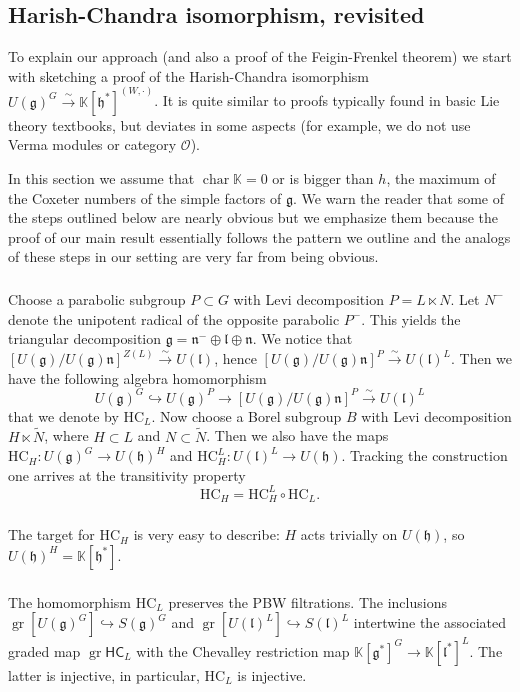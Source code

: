 \documentclass{amsart}
\theoremstyle{definition}
\newcommand{\fl}{\mathfrak{l}}
\newcommand{\sss}{\subsubsection{}}
\newcommand{\g}{\mathfrak{g}}
\newcommand{\gr}{\operatorname{gr}}
\newcommand{\h}{\mathfrak{h}}
\newcommand{\HC}{\mathrm{HC}} %
\newcommand{\lf}{\mathfrak{l}}
\newcommand{\bK}{\mathbb{K}}
\renewcommand{\bK}{\mathbb{K}} %
\newcommand{\sO}{\mathscr{O}}
\numberwithin{equation}{section}
\begin{document}
\subsection{Harish-Chandra isomorphism, revisited}\label{SS_HC_iso_intro}
To explain our approach (and also a proof of the Feigin-Frenkel theorem) we start with sketching a proof of the Harish-Chandra isomorphism $U(\g)^G\xrightarrow{\sim} \bK[\h^*]^{(W,\cdot)}$. It is quite similar to proofs typically found in basic Lie theory textbooks, but deviates in some aspects (for example, we do not use Verma modules or category $\sO$). 

In this section we assume that $\operatorname{char}\bK=0$ or is bigger than $h$, the maximum of the Coxeter numbers of the simple factors of $\g$. We warn the reader that some of the steps outlined below are nearly obvious but we emphasize them because the proof of our main result essentially follows the pattern we outline and the analogs of these steps in our setting are very far from being obvious. 

\sss\label{SSS_HC_iso_map}
Choose a parabolic subgroup $P\subset G$ with Levi decomposition $P=L\ltimes N$. Let $N^-$ denote the unipotent radical of the opposite parabolic $P^-$. 
This yields the triangular decomposition $\g=\mathfrak{n}^-\oplus \mathfrak{l}\oplus \mathfrak{n}$. We notice that $[U(\g)/U(\g)\mathfrak{n}]^{Z(L)}\xrightarrow{\sim}U(\fl)$, hence $[U(\g)/U(\g)\mathfrak{n}]^P\xrightarrow{\sim} U(\lf)^L$.
Then we have the following algebra homomorphism
$$U(\g)^G\hookrightarrow U(\g)^P\rightarrow [U(\g)/U(\g)\mathfrak{n}]^P\xrightarrow{\sim} U(\lf)^L$$
that we denote by $\HC_L$. Now choose a Borel subgroup $B$
with Levi decomposition $H\ltimes \tilde{N}$, where $H\subset L$
and $N\subset \tilde{N}$. Then we also have the maps $\HC_H:U(\g)^G\rightarrow U(\h)^H$ and $\HC^L_H: U(\lf)^L\rightarrow U(\h)$. Tracking the construction one arrives at the transitivity property
\begin{equation}\label{eq:HC_transitivity_baby}
\HC_H=\HC^L_H\circ \HC_L.
\end{equation}

\sss\label{SSS_HC_target} The target for $\HC_H$ is very easy to describe: $H$ acts trivially on $U(\h)$, so $U(\h)^H=\bK[\h^*]$.

\sss\label{SSS_HC_graded} 
The homomorphism $\HC_L$ preserves the PBW filtrations. 
The inclusions $\gr[U(\g)^G]\hookrightarrow S(\g)^G$ and 
$\gr[U(\lf)^L]\hookrightarrow S(\lf)^L$ intertwine 
the associated graded map $\gr \mathsf{HC}_L$ with the Chevalley restriction map $\bK[\g^*]^G\rightarrow \bK[\lf^*]^L$. The latter is injective, in particular, $\HC_L$ is injective. 
\end{document}
